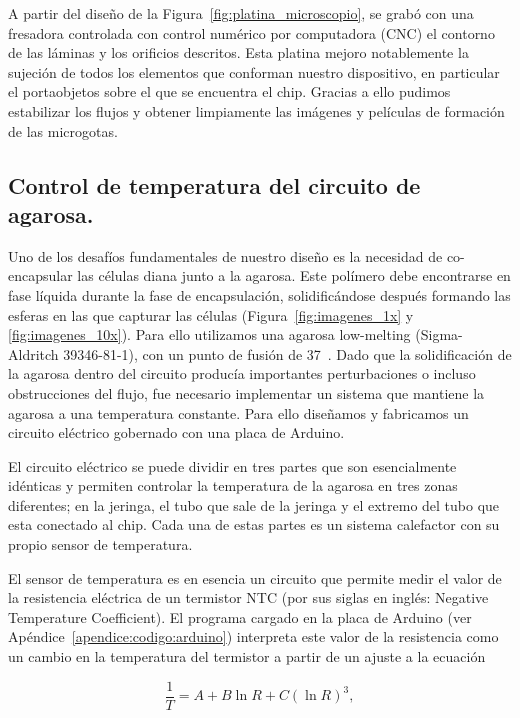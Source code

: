 A partir del diseño  de la Figura~\ref{fig:platina_microscopio}, se grabó con una fresadora controlada con control numérico por computadora (CNC) el contorno de las láminas y los orificios descritos. Esta platina mejoro notablemente la sujeción de todos los elementos que conforman nuestro dispositivo, en particular el portaobjetos sobre el que se encuentra el chip. Gracias a ello pudimos estabilizar los flujos y obtener limpiamente las imágenes y películas de formación de las microgotas. 

\subsection{Control de temperatura del circuito de agarosa.}

Uno de los desafíos fundamentales de nuestro diseño es la necesidad de co-encapsular las células diana junto a la agarosa. Este polímero debe encontrarse en fase líquida durante la fase de encapsulación, solidificándose después formando las esferas en las que capturar las células (Figura~\ref{fig:imagenes_1x} y \ref{fig:imagenes_10x}). Para ello utilizamos una agarosa low-melting (Sigma-Aldritch  39346-81-1), con un punto de fusión de 37~\celsius. Dado que la solidificación de la agarosa dentro del circuito producía importantes perturbaciones o incluso obstrucciones del flujo, fue necesario implementar un sistema que mantiene la agarosa a una temperatura constante. Para ello diseñamos y fabricamos un circuito eléctrico gobernado con una placa de Arduino.

El circuito eléctrico se puede dividir en tres partes que son esencialmente idénticas y permiten controlar la temperatura de la agarosa en tres zonas diferentes; en la jeringa, el tubo que sale de la jeringa y el extremo del tubo que esta conectado al chip. Cada una de estas partes es un sistema calefactor con su propio sensor de temperatura. 

El sensor de temperatura es en esencia un circuito que permite medir el valor de la resistencia eléctrica de un termistor NTC (por sus siglas en inglés: Negative Temperature Coefficient). El programa cargado en la placa de Arduino (ver Apéndice~\ref{apendice:codigo:arduino}) interpreta este valor de la resistencia como un cambio en la temperatura del termistor a partir de un ajuste a la ecuación

\begin{equation}
    \frac{1}{T}=A+B\ln{R}+C{(\ln{R})}^{3},
\end{equation}

